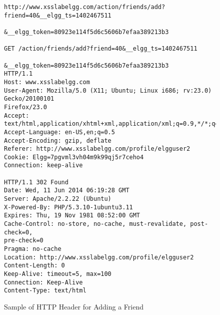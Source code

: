 \begin{figure}[b]
{\footnotesize
\begin{Verbatim}[frame=single]
http://www.xsslabelgg.com/action/friends/add?friend=40&__elgg_ts=1402467511
                             &__elgg_token=80923e114f5d6c5606b7efaa389213b3

GET /action/friends/add?friend=40&__elgg_ts=1402467511
                             &__elgg_token=80923e114f5d6c5606b7efaa389213b3
HTTP/1.1
Host: www.xsslabelgg.com
User-Agent: Mozilla/5.0 (X11; Ubuntu; Linux i686; rv:23.0) Gecko/20100101
Firefox/23.0
Accept: text/html,application/xhtml+xml,application/xml;q=0.9,*/*;q=0.8
Accept-Language: en-US,en;q=0.5
Accept-Encoding: gzip, deflate
Referer: http://www.xsslabelgg.com/profile/elgguser2
Cookie: Elgg=7pgvml3vh04m9k99qj5r7ceho4
Connection: keep-alive

HTTP/1.1 302 Found
Date: Wed, 11 Jun 2014 06:19:28 GMT
Server: Apache/2.2.22 (Ubuntu)
X-Powered-By: PHP/5.3.10-1ubuntu3.11
Expires: Thu, 19 Nov 1981 08:52:00 GMT
Cache-Control: no-store, no-cache, must-revalidate, post-check=0,
pre-check=0
Pragma: no-cache
Location: http://www.xsslabelgg.com/profile/elgguser2
Content-Length: 0
Keep-Alive: timeout=5, max=100
Connection: Keep-Alive
Content-Type: text/html
\end{Verbatim}
}
\caption{Sample of HTTP Header for Adding a Friend}
\label{fig:livehttptext}
\end{figure}

